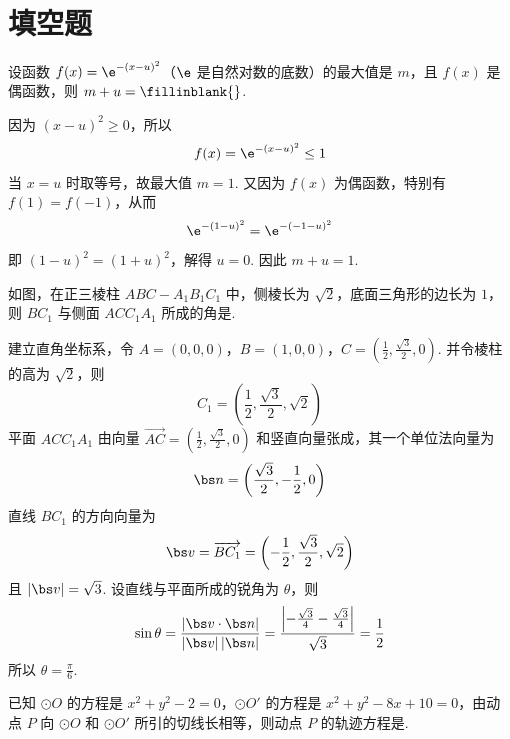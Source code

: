 \section{填空题}
\begin{problem}
设函数 \(f(x) = \e^{-(x-u)^2}\)（\(\e\) 是自然对数的底数）的最大值是 \(m\)，且 \(f(x)\) 是偶函数，则 \(m + u =\fillinblank{}\).
\end{problem}


\begin{solution}
因为 \((x-u)^2\geq0\)，所以
\[
f(x)=\e^{-(x-u)^2}\leq1
\]
当 \(x=u\) 时取等号，故最大值 \(m=1\). 又因为 \(f(x)\) 为偶函数，特别有 \(f(1)=f(-1)\)，从而
\[
\e^{-(1-u)^2}=\e^{-(-1-u)^2}
\]
即 \((1-u)^2=(1+u)^2\)，解得 \(u=0\). 因此 \(m+u=1\).
\end{solution}

\begin{problem}
如图，在正三棱柱 \(ABC - A_{1}B_{1}C_{1}\) 中，侧棱长为 \(\sqrt{2}\)，底面三角形的边长为 \(1\)，则 \(BC_{1}\) 与侧面 \(ACC_{1}A_{1}\) 所成的角是\fillinblank{}.

\end{problem}


\begin{solution}
建立直角坐标系，令 \(A=(0,0,0)\)，\(B=(1,0,0)\)，\(C=\left(\frac12,\frac{\sqrt3}{2},0\right)\).
并令棱柱的高为 \(\sqrt2\)，则
\[
C_1=\left(\frac12,\frac{\sqrt3}{2},\sqrt2\right)
\]
平面 \(ACC_1A_1\) 由向量 \(\overrightarrow{AC}=\left(\frac12,\frac{\sqrt3}{2},0\right)\) 和竖直向量张成，其一个单位法向量为
\[
\bs n=\left(\frac{\sqrt3}{2},-\frac12,0\right)
\]
直线 \(BC_1\) 的方向向量为
\[
\bs v=\overrightarrow{BC_1}=\left(-\frac12,\frac{\sqrt3}{2},\sqrt2\right)
\]
且 \(|\bs v|=\sqrt3\). 设直线与平面所成的锐角为 \(\theta\)，则
\[
\sin\theta=\frac{|\bs v\cdot\bs n|}{|\bs v|\,|\bs n|}
=\frac{\left|-\frac{\sqrt3}{4}-\frac{\sqrt3}{4}\right|}{\sqrt3}=\frac12
\]
所以 \(\theta=\frac\pi6\).
\end{solution}

\begin{problem}
已知 \(\odot O\) 的方程是 \(x^2 + y^2 - 2 = 0\)，\(\odot O'\) 的方程是 \(x^2 + y^2 - 8x + 10 = 0\)，由动点 \(P\) 向 \(\odot O\) 和 \(\odot O'\) 所引的切线长相等，则动点 \(P\) 的轨迹方程是\fillinblank{}.
\end{problem}


